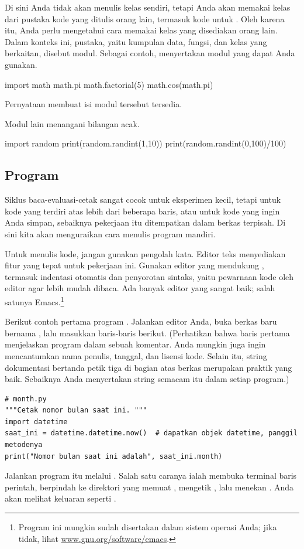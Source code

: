Di sini Anda tidak akan menulis kelas sendiri, 
tetapi Anda akan memakai kelas dari
pustaka kode yang ditulis orang lain, termasuk
kode untuk \Sage{}. Oleh karena itu, Anda perlu mengetahui cara memakai 
kelas yang disediakan orang lain.
Dalam konteks ini, pustaka, yaitu kumpulan data, fungsi, dan kelas yang berkaitan,
disebut modul.
Sebagai contoh, \python{} menyertakan modul  yang dapat Anda gunakan.
\begin{pythonconsole}
import math
math.pi
math.factorial(5)
math.cos(math.pi)
\end{pythonconsole}
Pernyataan  membuat isi
modul tersebut tersedia.

Modul lain menangani bilangan acak.
\begin{pythonconsole}
import random
print(random.randint(1,10))
print(random.randint(0,100)/100)
\end{pythonconsole}



\subsection{Program}
Siklus baca-evaluasi-cetak sangat cocok untuk eksperimen kecil, tetapi
untuk kode yang terdiri atas lebih dari beberapa baris, atau untuk kode yang ingin Anda
simpan, sebaiknya pekerjaan itu ditempatkan dalam berkas terpisah.
Di sini kita akan menguraikan cara menulis program mandiri.

Untuk menulis kode, 
jangan gunakan pengolah kata.
Editor teks menyediakan fitur yang tepat untuk pekerjaan ini.
Gunakan editor yang mendukung \python{}, termasuk
indentasi otomatis dan  
penyorotan sintaks, yaitu pewarnaan kode oleh editor agar lebih mudah
dibaca.
Ada banyak editor yang sangat baik; salah satunya Emacs.\footnote{%
  Program ini mungkin sudah disertakan dalam sistem operasi Anda; jika tidak, 
  lihat \protect\url{www.gnu.org/software/emacs}.}

Berikut contoh pertama program \python{}.
Jalankan editor Anda, buka berkas baru bernama , lalu masukkan baris-baris berikut.
(Perhatikan bahwa baris pertama menjelaskan program dalam sebuah komentar.
Anda mungkin juga ingin mencantumkan nama penulis, tanggal, dan lisensi kode.
Selain itu, string dokumentasi bertanda petik tiga di bagian atas berkas
merupakan praktik yang baik.
Sebaiknya Anda menyertakan string semacam itu dalam setiap program.)
\begin{lstlisting}[style=python]
# month.py
"""Cetak nomor bulan saat ini. """
import datetime
saat_ini = datetime.datetime.now()  # dapatkan objek datetime, panggil metodenya
print("Nomor bulan saat ini adalah", saat_ini.month)
\end{lstlisting}
Jalankan program itu melalui \python{}.
Salah satu caranya ialah membuka terminal baris perintah,
berpindah ke direktori yang memuat ,  
mengetik , lalu menekan . 
Anda akan melihat
keluaran seperti .

